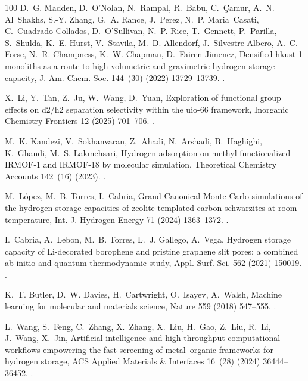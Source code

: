 \documentclass[review]{elsarticle}
\begin{document}
\begin{thebibliography}{100}
D.~G. Madden, D.~O’Nolan, N.~Rampal, R.~Babu, C.~{\c{C}}amur, A.~N.
  Al~Shakhs, S.-Y. Zhang, G.~A. Rance, J.~Perez, N.~P. Maria~Casati,
  C.~Cuadrado-Collados, D.~O’Sullivan, N.~P. Rice, T.~Gennett, P.~Parilla,
  S.~Shulda, K.~E. Hurst, V.~Stavila, M.~D. Allendorf, J.~Silvestre-Albero,
  A.~C. Forse, N.~R. Champness, K.~W. Chapman, D.~Fairen-Jimenez, Densified
  hkust-1 monoliths as a route to high volumetric and gravimetric hydrogen
  storage capacity, J. Am. Chem. Soc. 144~(30) (2022) 13729--13739.
\newblock \href {https://doi.org/10.1021/jacs.2c04608}
  {}.

X.~Li, Y.~Tan, Z.~Ju, W.~Wang, D.~Yuan, Exploration of functional group effects
  on d2/h2 separation selectivity within the uio-66 framework, Inorganic
  Chemistry Frontiers 12 (2025) 701--706.
\newblock \href {https://doi.org/10.1039/D4QI02802C}
  {}.

M.~K. Kandezi, V.~Sokhanvaran, Z.~Ahadi, N.~Arshadi, B.~Haghighi, K.~Ghandi,
  M.~S. Lakmehsari, Hydrogen adsorption on methyl‑functionalized {IRMOF‑1}
  and {IRMOF‑18} by molecular simulation, Theoretical Chemistry Accounts
  142~(16) (2023).
\newblock \href {https://doi.org/10.1007/s00214-023-02954-5}
  {}.

M.~L\'opez, M.~B. Torres, I.~Cabria, {G}rand {C}anonical {M}onte {C}arlo
  simulations of the hydrogen storage capacities of zeolite-templated carbon
  schwarzites at room temperature, Int. J. Hydrogen Energy 71 (2024)
  1363--1372.
\newblock \href {https://doi.org/10.1016/j.ijhydene.2024.05.256}
  {}.

I.~Cabria, A.~Lebon, M.~B. Torres, L.~J. Gallego, A.~Vega, Hydrogen storage
  capacity of {Li}-decorated borophene and pristine graphene slit pores: a
  combined ab-initio and quantum-thermodynamic study, Appl. Surf. Sci. 562
  (2021) 150019.
\newblock \href {https://doi.org/10.1016/j.apsusc.2021.150019}
  {}.

K.~T. Butler, D.~W. Davies, H.~Cartwright, O.~Isayev, A.~Walsh, Machine
  learning for molecular and materials science, Nature 559 (2018) 547--555.
\newblock \href {https://doi.org/10.1038/s41586-018-0337-2}
  {}.

L.~Wang, S.~Feng, C.~Zhang, X.~Zhang, X.~Liu, H.~Gao, Z.~Liu, R.~Li, J.~Wang,
  X.~Jin, Artificial intelligence and high-throughput computational workflows
  empowering the fast screening of metal–organic frameworks for hydrogen
  storage, ACS Applied Materials \& Interfaces 16~(28) (2024) 36444--36452.
\newblock \href {https://doi.org/10.1021/acsami.4c06416}
  {}.


\end{thebibliography}
\end{document}
